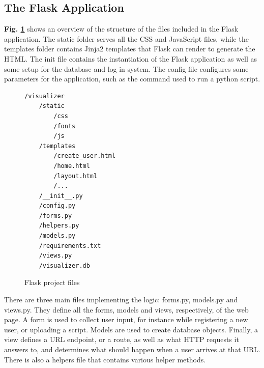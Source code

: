 
\subsection{The Flask Application}

\textbf{Fig. \ref{struct}} shows an overview of the structure of the files included in the Flask application. The static folder serves all the CSS and JavaScript files, while the templates folder contains Jinja2 templates that Flask can render to generate the HTML. The init file contains the instantiation of the Flask application as well as some setup for the database and log in system. The config file configures some parameters for the application, such as the command used to run a python script.\\

\begin{figure}[h!]
\begin{verbatim}
/visualizer
    /static
        /css
        /fonts
        /js
    /templates
        /create_user.html
        /home.html
        /layout.html
        /...
    /__init__.py
    /config.py
    /forms.py
    /helpers.py
    /models.py
    /requirements.txt
    /views.py
    /visualizer.db
\end{verbatim}
\caption{Flask project files}
\label{struct}
\end{figure}

\noindent There are three main files implementing the logic: forms.py, models.py and views.py. They define all the forms, models and views, respectively, of the web page. A form is used to collect user input, for instance while registering a new user, or uploading a script. Models are used to create database objects. Finally, a view defines a URL endpoint, or a route, as well as what HTTP requests it answers to, and determines what should happen when a user arrives at that URL. There is also a helpers file that contains various helper methods.\\

